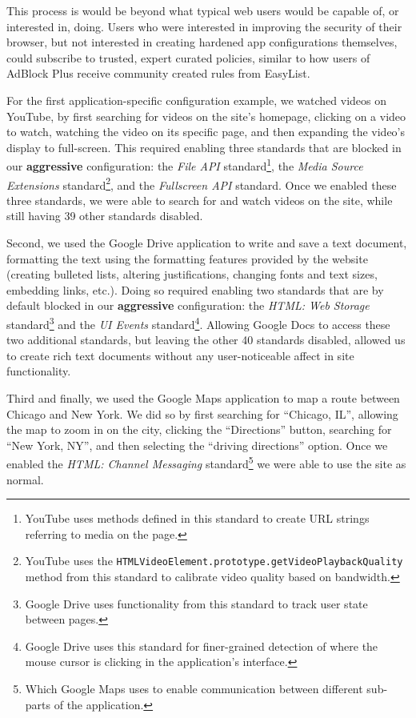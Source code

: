This process is would be beyond what typical web users would be
capable of, or interested in, doing.  Users who were interested in improving the
security of their browser, but not interested in creating hardened app
configurations themselves, could subscribe to trusted, expert curated policies,
similar to how users of AdBlock Plus receive community created rules from
EasyList.

For the first application-specific configuration example, we watched videos on
YouTube, by first searching for videos on the site's homepage, clicking on a
video to watch, watching the video on its specific page, and then expanding the
video's display to full-screen.  This required enabling three standards
that are blocked in our \textbf{aggressive} configuration: the \textit{File
API} standard\footnote{YouTube uses methods defined in this standard to create
URL strings referring to media on the page.}, the \textit{Media Source
Extensions} standard\footnote{YouTube uses the
\texttt{HTMLVideoElement.prototype.getVideoPlaybackQuality} method from this
standard to calibrate video quality based on bandwidth.}, and the
\textit{Fullscreen API} standard. Once we enabled these three standards,
we were able to search for and watch videos on the site, while still
having 39 other standards disabled.

Second, we used the Google Drive application to write and save a text document,
formatting the text using the formatting features provided by the website
(creating bulleted lists, altering justifications, changing fonts and text
sizes, embedding links, etc.).  Doing so required enabling two standards that
are by default blocked in our \textbf{aggressive} configuration: the
\textit{HTML: Web Storage} standard\footnote{Google Drive uses functionality
from this standard to track user state between pages.} and the \textit{UI
Events} standard\footnote{Google Drive uses this standard for finer-grained
detection of where the mouse cursor is clicking in the application's
interface.}.  Allowing Google Docs to access these two additional standards,
but leaving the other 40 standards disabled, allowed us to create rich text
documents without any user-noticeable affect in site functionality.

Third and finally, we used the Google Maps application to map a route between
Chicago and New York.  We did so by first searching for ``Chicago, IL'',
allowing the map to zoom in on the city, clicking the ``Directions'' button,
searching for ``New York, NY'', and then selecting the ``driving directions''
option.  Once we enabled the \textit{HTML: Channel Messaging}
standard\footnote{Which Google Maps uses to enable communication between
different sub-parts of the application.} we were able to use the site as
normal.

